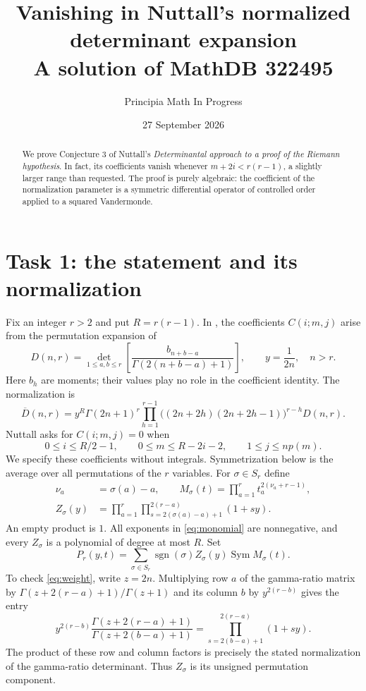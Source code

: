 \documentclass[11pt]{article}
\title{Vanishing in Nuttall's normalized determinant expansion\\
\large A solution of MathDB 322495}
\author{Principia Math In Progress}
\date{27 September 2026}
\newcommand{\Sym}{\operatorname{Sym}}
\newcommand{\sgn}{\operatorname{sgn}}
\begin{document}
\maketitle
\begin{abstract}
We prove Conjecture 3 of Nuttall's \emph{Determinantal approach to a proof
of the Riemann hypothesis}. In fact, its coefficients vanish whenever
$m+2i<r(r-1)$, a slightly larger range than requested. The proof is purely
algebraic: the coefficient of the normalization parameter is a symmetric
differential operator of controlled order applied to a squared Vandermonde.
\end{abstract}

\section*{Task 1: the statement and its normalization}
Fix an integer $r>2$ and put $R=r(r-1)$. In \cite[Section 7.2]{N},
the coefficients $C(i;m,j)$ arise from the permutation expansion of
\[
 D(n,r)=\det_{1\leq a,b\leq r}
 \left[\frac{b_{n+b-a}}{\Gamma(2(n+b-a)+1)}\right],
 \qquad y=\frac1{2n},\quad n>r.
\]
Here $b_h$ are moments; their values play no role in the coefficient
identity. The normalization is
\[
 \overline D(n,r)=y^R\Gamma(2n+1)^r
 \prod_{h=1}^{r-1}\bigl((2n+2h)(2n+2h-1)\bigr)^{r-h}D(n,r).
\]
Nuttall asks for $C(i;m,j)=0$ when
\[
 0\leq i\leq R/2-1,\qquad 0\leq m\leq R-2i-2,
 \qquad 1\leq j\leq np(m).
\]
We specify these coefficients without integrals. Symmetrization below is
the average over all permutations of the $r$ variables. For
$\sigma\in S_r$ define
\begin{align}
 \nu_a&=\sigma(a)-a,\qquad
 M_\sigma(t)=\prod_{a=1}^r t_a^{2(\nu_a+r-1)},\label{eq:monomial}\\
 Z_\sigma(y)&=\prod_{a=1}^r
       \prod_{s=2(\sigma(a)-a)+1}^{2(r-a)}(1+sy).\label{eq:weight}
\end{align}
An empty product is $1$. All exponents in \eqref{eq:monomial} are
nonnegative, and every $Z_\sigma$ is a polynomial of degree at most $R$.
Set
\begin{equation}\label{eq:P}
 P_r(y,t)=\sum_{\sigma\in S_r}\sgn(\sigma)Z_\sigma(y)
                                  \Sym M_\sigma(t).
\end{equation}
To check \eqref{eq:weight}, write $z=2n$. Multiplying row $a$ of the
gamma-ratio matrix by $\Gamma(z+2(r-a)+1)/\Gamma(z+1)$ and its
column $b$ by $y^{2(r-b)}$ gives the entry
\[
 y^{2(r-b)}\frac{\Gamma(z+2(r-a)+1)}{\Gamma(z+2(b-a)+1)}
 =\prod_{s=2(b-a)+1}^{2(r-a)}(1+sy).
\]
The product of these row and column factors is precisely the stated
normalization of the gamma-ratio determinant. Thus $Z_\sigma$ is its
unsigned permutation component.
\end{document}
